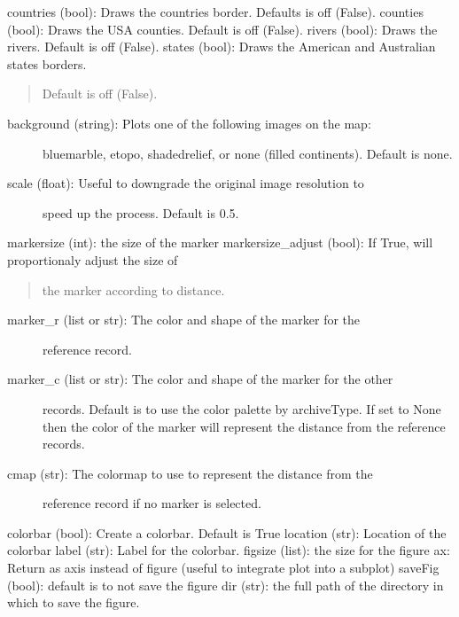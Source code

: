\documentclass[letterpaper,10pt,english]{sphinxmanual}
\begin{document}
\begin{fulllineitems}
\begin{description}
countries (bool): Draws the countries border. Defaults is off (False). 
counties (bool): Draws the USA counties. Default is off (False).
rivers (bool): Draws the rivers. Default is off (False).
states (bool): Draws the American and Australian states borders.
\begin{quote}

Default is off (False).
\end{quote}
\begin{description}
\item[{background (string): Plots one of the following images on the map: }] \leavevmode
bluemarble, etopo, shadedrelief, or none (filled continents). 
Default is none.

\item[{scale (float): Useful to downgrade the original image resolution to}] \leavevmode
speed up the process. Default is 0.5.

\end{description}

markersize (int): the size of the marker
markersize\_adjust (bool): If True, will proportionaly adjust the size of
\begin{quote}

the marker according to distance.
\end{quote}
\begin{description}
\item[{marker\_r (list or str): The color and shape of the marker for the}] \leavevmode
reference record.

\item[{marker\_c (list or str): The color and shape of the marker for the other}] \leavevmode
records. Default is to use the color palette by archiveType. If set
to None then the color of the marker will represent the distance from
the reference records.

\item[{cmap (str): The colormap to use to represent the distance from the }] \leavevmode
reference record if no marker is selected.

\end{description}

colorbar (bool): Create a colorbar. Default is True
location (str): Location of the colorbar
label (str): Label for the colorbar.
figsize (list): the size for the figure
ax: Return as axis instead of figure (useful to integrate plot into a subplot)
saveFig (bool): default is to not save the figure
dir (str): the full path of the directory in which to save the figure.
\begin{quote}


\end{quote}
\end{description}
\end{fulllineitems}
\end{document}

